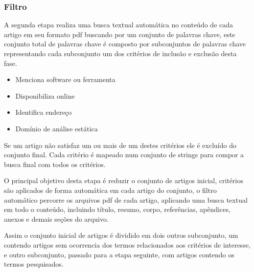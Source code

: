 




\subsubsection{Filtro}

A segunda etapa realiza uma busca textual automática no conteúdo de cada artigo
em seu formato pdf buscando por um conjunto de palavras chave, este conjunto
total de palavras chave é composto por subconjuntos de palavras chave
representando cada subconjunto um dos critérios de inclusão e exclusão desta
fase.

\begin{itemize}
  \item Menciona software ou ferramenta
  \item Disponibiliza online
  \item Identifica endereço
  \item Domínio de análise estática
\end{itemize}

Se um artigo não satisfaz um ou mais de um destes critérios ele é excluído do
conjunto final. Cada critério é mapeado num conjunto de strings para compor a
busca final com todos os critérios.

O principal objetivo desta etapa é reduzir o conjunto de artigos inicial,
critérios são aplicados de forma automática em cada artigo do conjunto, o
filtro automático percorre os arquivos pdf de cada artigo, aplicando uma busca
textual em todo o conteúdo, incluindo título, resumo, corpo, referências,
apêndices, anexos e demais seções do arquivo.

Assim o conjunto inicial de artigos é dividido em dois outros subconjunto, um
contendo artigos sem ocorrencia dos termos relacionados aos critérios de
interesse, e outro subconjunto, passado para a etapa seguinte, com artigos
contendo os termos pesquisados.

